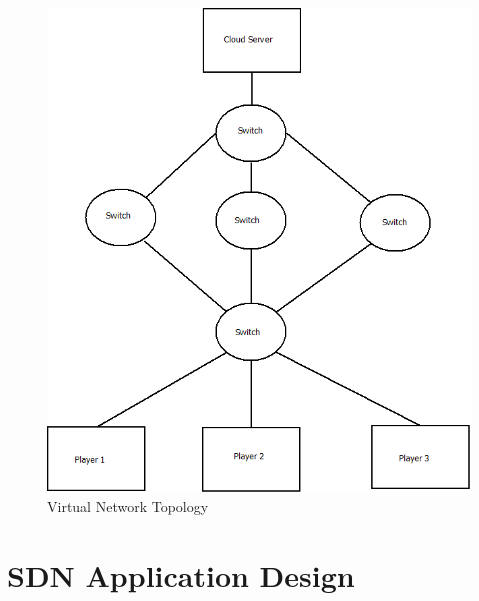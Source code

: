 \begin{figure}[h]
 \centering
 \includegraphics[width=0.7\linewidth]{images/network.png}
 \caption{Virtual Network Topology}
 \label{fig:network}
\end{figure}

\section{SDN Application Design}
\lipsum[1-1]